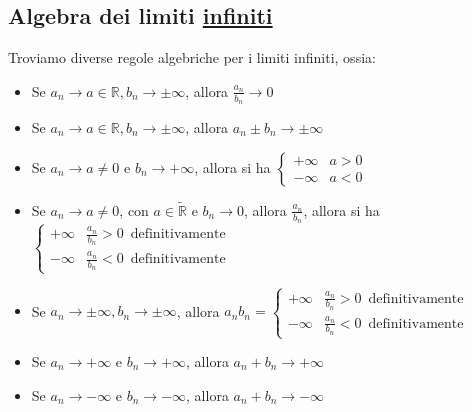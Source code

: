 \documentclass{article}
\theoremstyle{definition}
\begin{document}
\subsection{Algebra dei limiti \underline{infiniti}}
Troviamo diverse regole algebriche per i limiti infiniti, ossia:
\begin{itemize}
    \item Se $a_n \longrightarrow a \in \mathbb{R}, b_n \longrightarrow \pm \infty$, allora $\frac{a_n}{b_n}\longrightarrow 0$
    \item Se $a_n \longrightarrow a \in \mathbb{R}, b_n \longrightarrow \pm \infty$, allora $a_n \pm b_n \longrightarrow \pm \infty$
    \item Se $a_n \longrightarrow a \neq 0$ e $b_n \longrightarrow +\infty$, allora si ha $\left\{\begin{array}{cc}
       +\infty  &  a>0\\
       -\infty  & a<0
    \end{array}\right.$
    \item Se $a_n \longrightarrow a \neq 0$, con $a \in \widetilde{\mathbb{R}}$ e $b_n \longrightarrow 0$, allora $\frac{a_n}{b_n}$, allora si ha$\left\{\begin{array}{cc}
       +\infty  &  \frac{a_n}{b_n}>0 \,\,\, \mbox{definitivamente}\\
       -\infty  & \frac{a_n}{b_n}<0 \,\,\, \mbox{definitivamente}
    \end{array}\right.$
    \item Se $a_n \longrightarrow \pm \infty, b_n \longrightarrow\pm \infty$, allora $a_nb_n=\left\{\begin{array}{cc}
       +\infty  &  \frac{a_n}{b_n}>0 \,\,\, \mbox{definitivamente}\\
       -\infty  & \frac{a_n}{b_n}<0 \,\,\, \mbox{definitivamente}
    \end{array}\right.$
    \item Se $a_n \longrightarrow+\infty$ e $b_n \longrightarrow +\infty$, allora $a_n+b_n \longrightarrow +\infty$
    \item Se $a_n \longrightarrow -\infty$ e $b_n \longrightarrow -\infty$, allora $a_n+b_n \longrightarrow -\infty$
\end{itemize}
\end{document}
